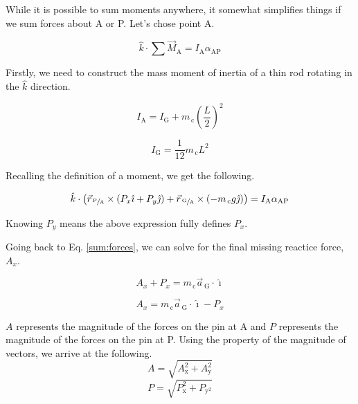 \documentclass[nofoot,pdf-a,balance,colorlinks,upint,subscriptcorrection,varvw,mathalfa=cal=boondoxo]{asmeconf}
\begin{document}
    

    While it is possible to sum moments anywhere, it somewhat simplifies things if we sum forces about A or P. Let's chose point A.

    \begin{equation}
        \hat{k}\cdot\sum{\vec{M}_{\textrm{A}}} = I_{\textrm{A}}\alpha_{\textrm{AP}}
    \end{equation}

    Firstly, we need to construct the mass moment of inertia of a thin rod rotating in the $\hat{k}$ direction.


    \begin{equation} 
        I_{\textrm{A}} = I_{\textrm{G}} + m_{\,\textrm{c}}{\left(\frac{L}{2}\right)}^2
    \end{equation}

    \begin{equation} 
        I_{\textrm{G}} = \frac{1}{12}m_{\,\textrm{c}}L^2
    \end{equation}

    Recalling the definition of a moment, we get the following.

    \begin{equation}
        \hat{k}\cdot\left(\vec{r}_{\,\sfrac{\textrm{P}}{\textrm{A}}} \times \left(P_x \hat{\imath} + P_y \hat{\jmath}\right) + \vec{r}_{\,\sfrac{\textrm{G}}{\textrm{A}}}\times\left(-m_{\,\textrm{c}}g\hat{\jmath}\right)\right)  = I_{\textrm{A}}\alpha_{\textrm{AP}}
    \end{equation}

    Knowing $P_y$ means the above expression fully defines $P_x$.

    

    Going back to Eq. \eqref{sum:forces}, we can solve for the final missing reactice force, $A_x$.

    \begin{equation}
            A_x + P_x = m_{\,\textrm{c}}\vec{a}_{\,\textrm{G}} \cdot \hat{\imath}
    \end{equation}

    \begin{equation}
            A_x = m_{\,\textrm{c}}\vec{a}_{\,\textrm{G}} \cdot \hat{\imath} -  P_x 
    \end{equation}

    


    $A$ represents the magnitude of the forces on the pin at A and $P$ represents the magnitude of the forces on the pin at P.  Using the property of the magnitude of vectors, we arrive at the following.
    \begin{equation}
        A = \sqrt{A_{\textrm{x}}^2 + A_{\textrm{y}}^2}
    \end{equation}
    \begin{equation}
        P = \sqrt{P_{\textrm{x}}^2 + P_{\textrm{y}^2}}
    \end{equation}
\end{document}
